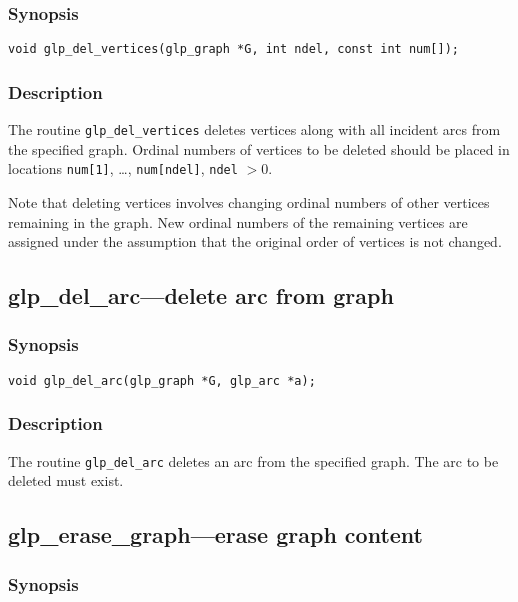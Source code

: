 \documentclass[dvipdfm,11pt]{report}
\begin{document}
\subsubsection*{Synopsis}

\begin{verbatim}
void glp_del_vertices(glp_graph *G, int ndel, const int num[]);
\end{verbatim}

\subsubsection*{Description}

The routine \verb|glp_del_vertices| deletes vertices along with all
incident arcs from the specified graph. Ordinal numbers of vertices to
be deleted should be placed in locations \verb|num[1]|, \dots,
\verb|num[ndel]|, \verb|ndel| $>0$.

Note that deleting vertices involves changing ordinal numbers of other
vertices remaining in the graph. New ordinal numbers of the remaining
vertices are assigned under the assumption that the original order of
vertices is not changed.

\subsection{glp\_del\_arc---delete arc from graph}

\subsubsection*{Synopsis}

\begin{verbatim}
void glp_del_arc(glp_graph *G, glp_arc *a);
\end{verbatim}

\subsubsection*{Description}

The routine \verb|glp_del_arc| deletes an arc from the specified graph.
The arc to be deleted must exist.

\subsection{glp\_erase\_graph---erase graph content}

\subsubsection*{Synopsis}
\end{document}
